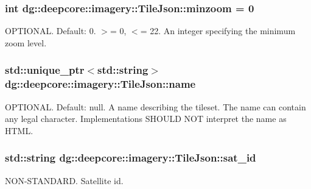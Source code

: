 \subsubsection[{\texorpdfstring{minzoom}{minzoom}}]{\setlength{\rightskip}{0pt plus 5cm}int dg\+::deepcore\+::imagery\+::\+Tile\+Json\+::minzoom = 0}\hypertarget{structdg_1_1deepcore_1_1imagery_1_1_tile_json_a77756c09c221095697741311a6a6ee50}{}\label{structdg_1_1deepcore_1_1imagery_1_1_tile_json_a77756c09c221095697741311a6a6ee50}
O\+P\+T\+I\+O\+N\+AL. Default\+: 0. $>$= 0, $<$= 22. An integer specifying the minimum zoom level. 
\subsubsection[{\texorpdfstring{name}{name}}]{\setlength{\rightskip}{0pt plus 5cm}std\+::unique\+\_\+ptr$<$std\+::string$>$ dg\+::deepcore\+::imagery\+::\+Tile\+Json\+::name}\hypertarget{structdg_1_1deepcore_1_1imagery_1_1_tile_json_a5e1cb3591fa0d3c15184869d90bf42f9}{}\label{structdg_1_1deepcore_1_1imagery_1_1_tile_json_a5e1cb3591fa0d3c15184869d90bf42f9}
O\+P\+T\+I\+O\+N\+AL. Default\+: null. A name describing the tileset. The name can contain any legal character. Implementations S\+H\+O\+U\+LD N\+OT interpret the name as H\+T\+ML. 
\subsubsection[{\texorpdfstring{sat\+\_\+id}{sat_id}}]{\setlength{\rightskip}{0pt plus 5cm}std\+::string dg\+::deepcore\+::imagery\+::\+Tile\+Json\+::sat\+\_\+id}\hypertarget{structdg_1_1deepcore_1_1imagery_1_1_tile_json_aaa10ce3c28b1d8a9b3cb678366241a56}{}\label{structdg_1_1deepcore_1_1imagery_1_1_tile_json_aaa10ce3c28b1d8a9b3cb678366241a56}
N\+O\+N-\/\+S\+T\+A\+N\+D\+A\+RD. Satellite id. 
